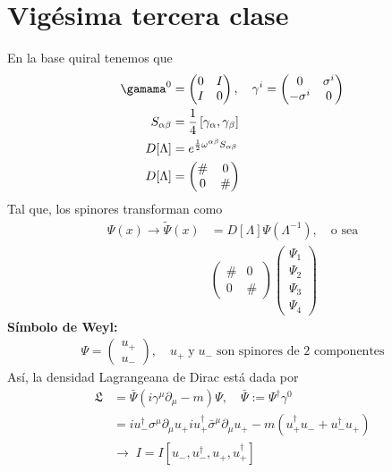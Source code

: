 \documentclass[../main.tex]{subfiles}
\begin{document}
\section{Vigésima tercera clase}
En la base quiral tenemos que
\begin{align*}
  \gamama^0 & = \begin{pmatrix}
    0 & I \\ I & 0 
  \end{pmatrix}
  , \quad \gamma^i = \begin{pmatrix}
    0 & \sigma^i \\ -\sigma^i & 0
  \end{pmatrix}
  \\
  S_{\alpha \beta} &  =\frac{1}{4} \left[ \gamma_\alpha , \gamma_\beta \right] \\
  D[\Lambda] & = e^{\frac{1}{2}\omega^{\alpha\beta}S_{\alpha \beta}} \\
  D[\Lambda] & = \begin{pmatrix}
    \# & 0 \\ 0 & \#
  \end{pmatrix}
\end{align*}
Tal que, los spinores transforman como
\begin{align*}
  \Psi(x) \rightarrow \tilde{\Psi}(x) & = D[\Lambda] \Psi(\Lambda^{-1}), \quad \text{o sea} \\
  & \begin{pmatrix}
    \# & 0 \\ 0 & \#
  \end{pmatrix}
  \begin{pmatrix}
    \Psi_1 \\ \Psi_2 \\ \Psi_3 \\ \Psi_4
  \end{pmatrix}
\end{align*}
\textbf{Símbolo de Weyl:}
\begin{align*}
  \Psi= \begin{pmatrix}
    u_+ \\ u_-
  \end{pmatrix}
  ,\quad u_+ \;\text{y} \; u_-\; \text{son spinores de 2 componentes}
\end{align*}
Así, la densidad Lagrangeana de Dirac está dada por
\begin{align*}
  \mathfrak{L} & = \bar{\Psi} \left( i\gamma^\mu \partial_\mu - m \right)\Psi, \quad \bar{\Psi}:= \Psi^\dagger \gamma^0 \\
  & = iu^\dagger_- \sigma^\mu \partial_\mu u_+ iu^\dagger_+\bar{\sigma}^\mu \partial_\mu u_+ - m \left( u^\dagger_+ u_- + u_-^\dagger u_+ \right) \\
  & \rightarrow \; I=I \left[ u_-, u^\dagger_-, u_+ , u^\dagger_+ \right]  
\end{align*}
\end{document}
